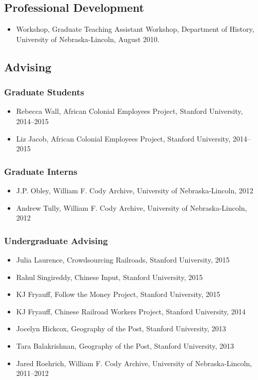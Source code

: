 \documentclass[10pt]{article}
\begin{document}
\subsection*{Professional Development}

\begin{itemize}
  \item Workshop, Graduate Teaching Assistant Workshop, Department of History, University of Nebraska-Lincoln, August 2010.
\end{itemize}

\subsection*{Advising}

\subsubsection*{Graduate Students}

\begin{itemize}
  \item Rebecca Wall, African Colonial Employees Project, Stanford University, 2014--2015
  \item Liz Jacob, African Colonial Employees Project, Stanford University, 2014--2015
\end{itemize}

\subsubsection*{Graduate Interns}

\begin{itemize}
  \item J.P. Obley, William F. Cody Archive, University of Nebraska-Lincoln, 2012
  \item Andrew Tully, William F. Cody Archive, University of Nebraska-Lincoln, 2012
\end{itemize}

\subsubsection*{Undergraduate Advising}

\begin{itemize}
  \item Julia Laurence, Crowdsourcing Railroads, Stanford University, 2015
  \item Rahul Singireddy, Chinese Input, Stanford University, 2015
  \item KJ Fryauff, Follow the Money Project, Stanford University, 2015
  \item KJ Fryauff, Chinese Railroad Workers Project, Stanford University, 2014
  \item Jocelyn Hickcox, Geography of the Post, Stanford University, 2013
  \item Tara Balakrishnan, Geography of the Post, Stanford University, 2013
  \item Jared Roehrich, William F. Cody Archive, University of Nebraska-Lincoln, 2011--2012
\end{itemize}
\end{document}
